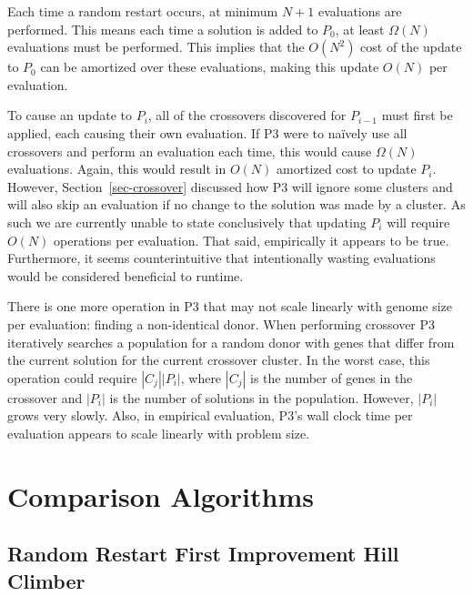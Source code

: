 \documentclass{sig-alternate}
\begin{document}
Each time a random restart occurs, at minimum $N+1$ evaluations are performed.
This means each time a solution is added to $P_0$, at least $\Omega(N)$ evaluations
must be performed.  This implies that the $O(N^2)$ cost of the update to $P_0$ can
be amortized over these evaluations, making this update $O(N)$ per evaluation.

To cause an update to $P_i$, all of the crossovers discovered for
$P_{i-1}$ must first be applied, each causing their own evaluation.
If P3 were to na\"ively use all crossovers and perform an evaluation
each time, this would cause $\Omega(N)$ evaluations.  Again, this would
result in $O(N)$ amortized cost to update $P_i$.  However,
Section~\ref{sec-crossover} discussed how P3 will ignore some clusters
and will also skip an evaluation if no change to the solution was made
by a cluster.  As such we are currently unable to state conclusively
that updating $P_i$ will require $O(N)$ operations per evaluation.  That said,
empirically it appears to be true.  Furthermore, it seems counterintuitive
that intentionally wasting evaluations would be considered beneficial
to runtime.

There is one more operation in P3 that may not scale linearly with
genome size per evaluation: finding a non-identical donor.  When
performing crossover P3 iteratively searches a population for a random
donor with genes that differ from the current solution for
the current crossover cluster.  In the worst case, this operation
could require $|C_j||P_i|$, where $|C_j|$ is the number of genes in
the crossover and $|P_i|$ is the number of solutions in the
population.  However, $|P_i|$ grows very slowly.  Also, in empirical
evaluation, P3's wall clock time per evaluation appears to scale
linearly with problem size.



\section{Comparison Algorithms}

\subsection{Random Restart First Improvement Hill Climber}
\end{document}
